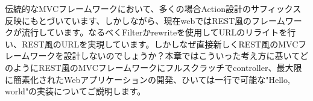 伝統的なMVCフレームワークにおいて、多くの場合Action設計のサフィックス反映にもとづいています、しかしながら、現在webではREST風のフレームワークが流行しています。なるべくFilterかrewriteを使用してURLのリライトを行い、REST風のURLを実現しています。しかしなぜ直接新しくREST風のMVCフレームワークを設計しないのでしょうか？本章ではこういった考え方に基いてどのようにREST風のMVCフレームワークにフルスクラッチでcontroller、最大限に簡素化されたWebアプリケーションの開発、ひいては一行で可能な"Hello, world"の実装についてご説明します。
